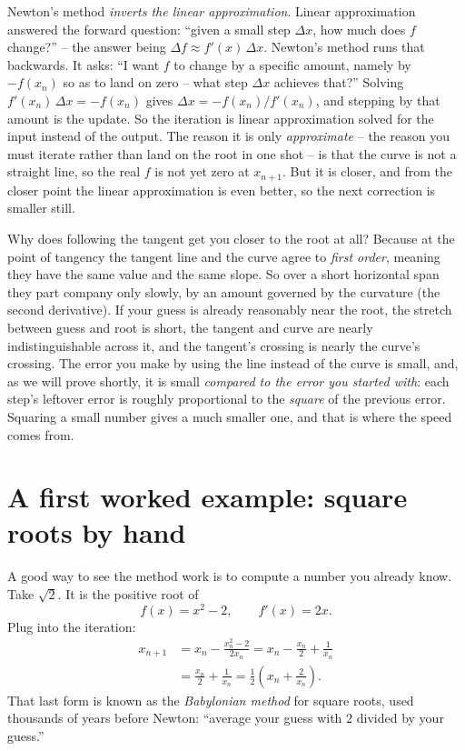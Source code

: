 \begin{happeningbox}
Newton's method \emph{inverts the linear
approximation}. Linear approximation answered the forward question: ``given a small
step $\Delta x$, how much does $f$ change?'' -- the answer being $\Delta f \approx
f'(x)\,\Delta x$. Newton's method runs that backwards. It asks: ``I want $f$ to
change by a specific amount, namely by $-f(x_n)$ so as to land on zero -- what step
$\Delta x$ achieves that?'' Solving $f'(x_n)\,\Delta x = -f(x_n)$ gives $\Delta x =
-f(x_n)/f'(x_n)$, and stepping by that amount is the update. So the iteration is
linear approximation solved for the input instead of the output. The reason it is
only \emph{approximate} -- the reason you must iterate rather than land on the root
in one shot -- is that the curve is not a straight line, so the real $f$ is
not yet zero at $x_{n+1}$. But it is closer, and from the closer point the linear
approximation is even better, so the next correction is smaller still.
\end{happeningbox}

\begin{whybox}
Why does following the tangent get you closer to the root at all? Because at the
point of tangency the tangent line and the curve agree to \emph{first order},
meaning they have the same value and the same slope. So over a short horizontal span they part
company only slowly, by an amount governed by the curvature (the second
derivative). If your guess is already reasonably near the root, the stretch between
guess and root is short, the tangent and curve are nearly indistinguishable across
it, and the tangent's crossing is nearly the curve's crossing. The error you make
by using the line instead of the curve is small, and, as we will prove
shortly, it is small \emph{compared to the error you started with}: each step's
leftover error is roughly proportional to the \emph{square} of the previous error.
Squaring a small number gives a much smaller one, and that is where the speed
comes from.
\end{whybox}

\section{A first worked example: square roots by hand}
\label{ch19:sqrt-example}

A good way to see the method work is to compute a number you already know. Take
$\sqrt2$. It is the positive root of
\[
  f(x) = x^2 - 2, \qquad f'(x) = 2x.
\]
Plug into the iteration:
\begin{align*}
  x_{n+1} &= x_n - \frac{x_n^2 - 2}{2 x_n}
           = x_n - \frac{x_n}{2} + \frac{1}{x_n}\\
          &= \frac{x_n}{2} + \frac{1}{x_n}
           = \frac{1}{2}\left(x_n + \frac{2}{x_n}\right).
\end{align*}
That last form is known as the \emph{Babylonian method} for square roots, used
thousands of years before Newton: ``average your guess with $2$ divided by your
guess.''

